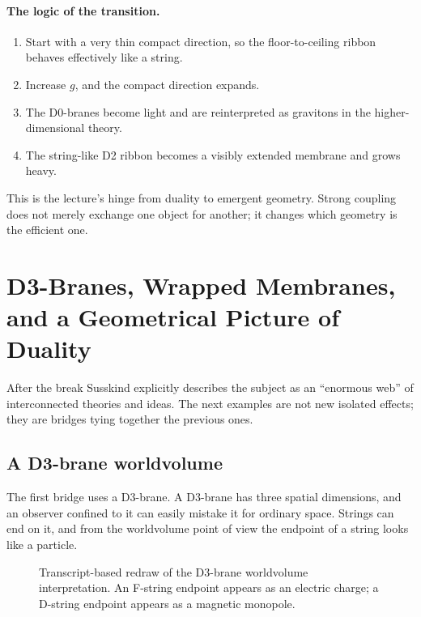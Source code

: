 \paragraph{The logic of the transition.}
\begin{enumerate}
\item Start with a very thin compact direction, so the floor-to-ceiling ribbon behaves effectively like a string.
\item Increase \(g\), and the compact direction expands.
\item The D0-branes become light and are reinterpreted as gravitons in the higher-dimensional theory.
\item The string-like D2 ribbon becomes a visibly extended membrane and grows heavy.
\end{enumerate}
This is the lecture's hinge from duality to emergent geometry. Strong coupling does not merely exchange one object for another; it changes which geometry is the efficient one.

\section{D3-Branes, Wrapped Membranes, and a Geometrical Picture of Duality}

After the break Susskind explicitly describes the subject as an ``enormous web'' of interconnected theories and ideas. The next examples are not new isolated effects; they are bridges tying together the previous ones.

\subsection{A D3-brane worldvolume}

The first bridge uses a D3-brane. A D3-brane has three spatial dimensions, and an observer confined to it can easily mistake it for ordinary space. Strings can end on it, and from the worldvolume point of view the endpoint of a string looks like a particle.

\begin{figure}[h]
\centering
{}%
\caption{Transcript-based redraw of the D3-brane worldvolume interpretation. An F-string endpoint appears as an electric charge; a D-string endpoint appears as a magnetic monopole.}
\end{figure}

